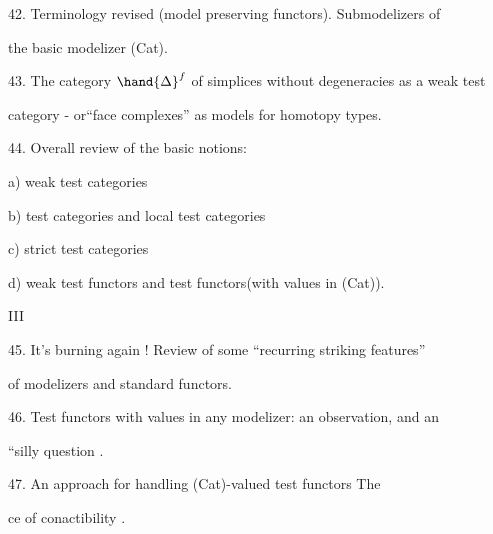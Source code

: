 42.  Terminology revised (model preserving functors).  Submodelizers of\par
the basic modelizer (Cat).\par

43.  The category $\hand{\Delta}^{f}$ of simplices without degeneracies as a weak test\par
category  -  or``face complexes'' as models for homotopy types.\par

44.  Overall review of the basic notions:\par

a)  weak test categories\par

b)  test categories and local test categories\par

c) strict test categories\par

d) weak test functors and test functors(with values in (Cat)).\par

   \hand{)}\par
III \hand{(}\par

45.  It's burning again ! Review of some ``recurring striking features''\par
of modelizers\hand{,} and  standard   functors.\par

\hand{(}46.\hand{)} Test functors with values in any modelizer: an observation, and an \par
``silly question .\par

47.  An approach for handling (Cat)-valued test functors\hand{,}  The \par%
ce of conactibility .\par

